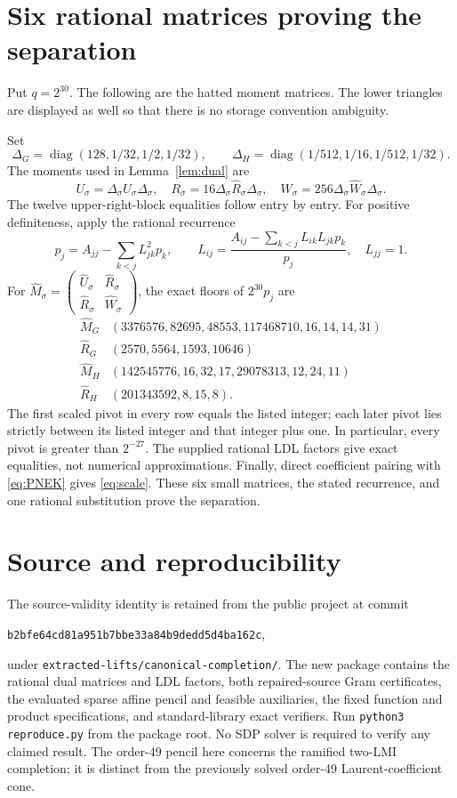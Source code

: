 \documentclass[10pt]{article}
\newcommand{\diag}{\operatorname{diag}}
\begin{document}
\section{Six rational matrices proving the separation}\label{app:dual}
Put $q=2^{30}$. The following are the hatted moment matrices. The lower
triangles are displayed as well so that there is no storage convention
ambiguity.

Set
\[
\Delta_G=\diag(128,1/32,1/2,1/32),\qquad
\Delta_H=\diag(1/512,1/16,1/512,1/32).
\]
The moments used in Lemma~\ref{lem:dual} are
\[
U_\sigma=\Delta_\sigma\widehat U_\sigma\Delta_\sigma,
\quad R_\sigma=16\Delta_\sigma\widehat R_\sigma\Delta_\sigma,
\quad W_\sigma=256\Delta_\sigma\widehat W_\sigma\Delta_\sigma.
\]
The twelve upper-right-block equalities follow entry by entry. For positive
definiteness, apply the rational recurrence
\[
p_j=A_{jj}-\sum_{k<j}L_{jk}^2p_k,\qquad
L_{ij}=\frac{A_{ij}-\sum_{k<j}L_{ik}L_{jk}p_k}{p_j},\quad L_{jj}=1.
\]
For $\widehat M_\sigma=\left(\begin{smallmatrix}
\widehat U_\sigma&\widehat R_\sigma\\
\widehat R_\sigma&\widehat W_\sigma\end{smallmatrix}\right)$,
the exact floors of $2^{30}p_j$ are
\[
\begin{array}{c|l}
\widehat M_G&(3376576,82695,48553,117468710,16,14,14,31)\\
\widehat R_G&(2570,5564,1593,10646)\\
\widehat M_H&(142545776,16,32,17,29078313,12,24,11)\\
\widehat R_H&(201343592,8,15,8).
\end{array}
\]
The first scaled pivot in every row equals the listed integer; each later
pivot lies strictly between its listed integer and that integer plus one.
In particular, every pivot is greater than $2^{-27}$. The supplied rational
LDL factors give exact equalities, not numerical approximations.
Finally, direct coefficient pairing with \eqref{eq:PNEK} gives
\eqref{eq:scale}. These six small matrices, the stated recurrence, and one
rational substitution prove the separation.

\section*{Source and reproducibility}
The source-validity identity is retained from the public project at commit
\begin{center}\texttt{b2bfe64cd81a951b7bbe33a84b9dedd5d4ba162c},\end{center}
under
\texttt{extracted-lifts/canonical-completion/}. The new package contains the
rational dual matrices and LDL factors, both repaired-source Gram
certificates, the evaluated sparse affine pencil and feasible auxiliaries,
the fixed function and product specifications, and standard-library exact
verifiers. Run \texttt{python3 reproduce.py} from the package root.
No SDP solver is required to verify any claimed result. The order-49 pencil
here concerns the ramified two-LMI completion; it is distinct from the
previously solved order-49 Laurent-coefficient cone.
\end{document}
